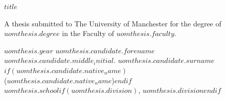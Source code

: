 \begin{titlepage}
\centering
\vspace*{6cm}
{\Large\bfseries $title$\par}
\vspace{3cm}
A thesis submitted to The University of Manchester
for the degree of $uomthesis.degree$
in the Faculty of $uomthesis.faculty$.
\vspace{3cm}

$uomthesis.year$
\vfill
$uomthesis.candidate.forename$ $uomthesis.candidate.middle_initial$. $uomthesis.candidate.surname$
$if(uomthesis.candidate.native_name)$\\($uomthesis.candidate.native_name$)$endif$\\[1ex]
$uomthesis.school$$if(uomthesis.division)$, $uomthesis.division$$endif$
\end{titlepage}
